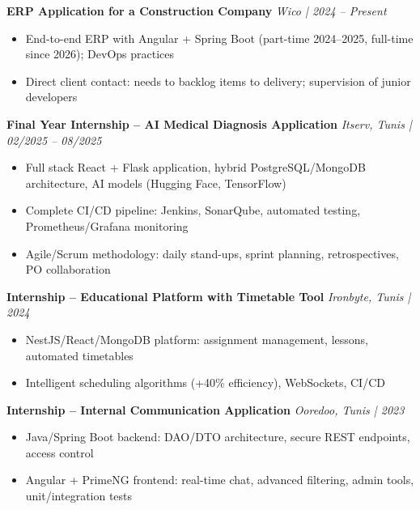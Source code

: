 \documentclass[10pt,a4paper]{article}
\begin{document}
{\footnotesize

\textbf{ERP Application for a Construction Company} \hfill \textit{Wico | 2024 -- Present}
\begin{itemize}[leftmargin=10pt,itemsep=0pt,topsep=1pt,parsep=0pt]
  \item End-to-end ERP with Angular + Spring Boot (part-time 2024--2025, full-time since 2026); DevOps practices
  \item Direct client contact: needs to backlog items to delivery; supervision of junior developers
\end{itemize}

\vspace{2pt}
\textbf{Final Year Internship -- AI Medical Diagnosis Application} \hfill \textit{Itserv, Tunis | 02/2025 -- 08/2025}
\begin{itemize}[leftmargin=10pt,itemsep=0pt,topsep=1pt,parsep=0pt]
  \item Full stack React + Flask application, hybrid PostgreSQL/MongoDB architecture, AI models (Hugging Face, TensorFlow)
  \item Complete CI/CD pipeline: Jenkins, SonarQube, automated testing, Prometheus/Grafana monitoring
  \item Agile/Scrum methodology: daily stand-ups, sprint planning, retrospectives, PO collaboration
\end{itemize}

\vspace{2pt}
\textbf{Internship -- Educational Platform with Timetable Tool} \hfill \textit{Ironbyte, Tunis | 2024}
\begin{itemize}[leftmargin=10pt,itemsep=0pt,topsep=1pt,parsep=0pt]
  \item NestJS/React/MongoDB platform: assignment management, lessons, automated timetables
  \item Intelligent scheduling algorithms (+40\% efficiency), WebSockets, CI/CD
\end{itemize}

\vspace{2pt}
\textbf{Internship -- Internal Communication Application} \hfill \textit{Ooredoo, Tunis | 2023}
\begin{itemize}[leftmargin=10pt,itemsep=0pt,topsep=1pt,parsep=0pt]
  \item Java/Spring Boot backend: DAO/DTO architecture, secure REST endpoints, access control
  \item Angular + PrimeNG frontend: real-time chat, advanced filtering, admin tools, unit/integration tests
\end{itemize}

}
\end{document}

